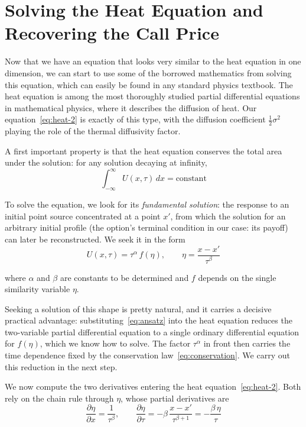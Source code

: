 \documentclass[a4paper,12pt]{article}
\numberwithin{equation}{section}
\begin{document}
\clearpage
\section{Solving the Heat Equation and Recovering the Call Price}

Now that we have an equation that looks very similar to the heat equation in one
dimension, we can start to use some of the borrowed mathematics from solving this
equation, which can easily be found in any standard physics textbook. The heat equation is among the most thoroughly studied partial
differential equations in mathematical physics, where it describes the diffusion
of heat. Our equation~\eqref{eq:heat-2} is exactly of this type, with
the diffusion coefficient $\tfrac{1}{2}\sigma^2$ playing the role of the thermal
diffusivity factor.

A first important property is that the heat equation conserves the total area
under the solution: for any solution decaying at infinity,
\begin{equation}\label{eq:conservation}
  \int_{-\infty}^{\infty} U(x,\tau)\,dx = \text{constant}
\end{equation}

To solve the equation, we look for its \emph{fundamental solution}: the response
to an initial point source concentrated at a point $x'$, from which the solution
for an arbitrary initial profile (the option's terminal condition in our case: its payoff) can later be reconstructed. We seek it in the form
\begin{equation}\label{eq:ansatz}
  U(x,\tau) = \tau^{\alpha}\, f(\eta), \qquad \eta = \frac{x - x'}{\tau^{\beta}}
\end{equation}

where $\alpha$ and $\beta$ are constants to be determined and $f$ depends on the
single similarity variable $\eta$.

Seeking a solution of this shape
is pretty natural, and it carries a decisive practical advantage:
substituting~\eqref{eq:ansatz} into the heat equation reduces the two-variable
partial differential equation to a single ordinary differential equation for
$f(\eta)$, which we know how to solve. The factor $\tau^{\alpha}$ in front then
carries the time dependence fixed by the conservation law~\eqref{eq:conservation}.
We carry out this reduction in the next step.

We now compute the two derivatives entering the heat equation~\eqref{eq:heat-2}.
Both rely on the chain rule through $\eta$, whose partial derivatives are
\[
  \frac{\partial \eta}{\partial x} = \frac{1}{\tau^{\beta}},
  \qquad
  \frac{\partial \eta}{\partial \tau}
    = -\beta\,\frac{x-x'}{\tau^{\beta+1}}
    = -\frac{\beta\,\eta}{\tau}
\]
\end{document}

